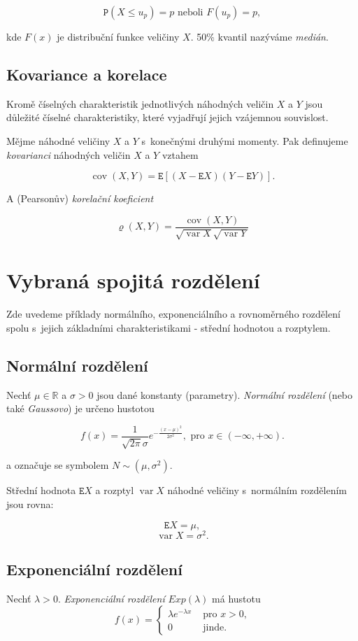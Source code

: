 \documentclass[thesis=B,czech]{FITthesis}[2012/06/26]
\DeclareMathOperator{\var}{var}						%
\DeclareMathOperator{\cov}{cov}						%
\begin{document}
$$\mathtt{P}(X\leq u_{p})=p \mbox{ neboli } F(u_{p})=p,$$

kde $F(x)$ je distribuční funkce veličiny $X$. 50\% kvantil nazýváme \textit{medián}.

\subsection{Kovariance a korelace}
Kromě číselných charakteristik jednotlivých náhodných veličin $X$ a $Y$ jsou důležité číselné charakteristiky, které vyjadřují jejich vzájemnou souvislost.

Mějme náhodné veličiny $X$ a $Y$ s~konečnými druhými momenty. Pak definujeme \textit{kovarianci} náhodných veličin $X$ a $Y$ vztahem

$$\cov(X,Y)=\mathtt{E}\left[ (X-\mathtt{E}X)(Y-\mathtt{E}Y) \right ].$$

A (Pearsonův) \textit{korelační koeficient}

$$\varrho(X,Y)=\frac{\cov(X,Y)}{\sqrt{\var X}\sqrt{\var Y}}$$


\section{Vybraná spojitá rozdělení}
Zde uvedeme příklady normálního, exponenciálního a rovnoměrného rozdělení spolu s~jejich základními charakteristikami - střední hodnotou a rozptylem.


\subsection{Normální rozdělení}
Nechť $\mu\in\mathbb{R}$ a $\sigma>0$ jsou dané konstanty (parametry). \textit{Normální rozdělení} (nebo také \textit{Gaussovo}) je určeno hustotou

$$f(x)=\frac{1}{\sqrt{2\pi}\sigma}e^{-\frac{(x-\mu)^2}{2\sigma^2} }, \mbox{ pro~} x\in(-\infty,+\infty).$$

a označuje se symbolem $N \sim (\mu,\sigma^2)$.

Střední hodnota $\mathtt{E}X$ a rozptyl $\var X$ náhodné veličiny s~normálním rozdělením jsou rovna:

$$\mathtt{E}X = \mu,$$
$$\var X=\sigma^2.$$ 

\subsection{Exponenciální rozdělení}
Nechť $\lambda > 0$. \textit{Exponenciální rozdělení} $Exp(\lambda)$ má hustotu
$$
f(x) = \left\{ \begin{array}{rl}
\lambda e^{-\lambda x} &\mbox{ pro~$x>0$,} \\
0 &\mbox{ jinde.}
\end{array} \right.
$$
\end{document}
